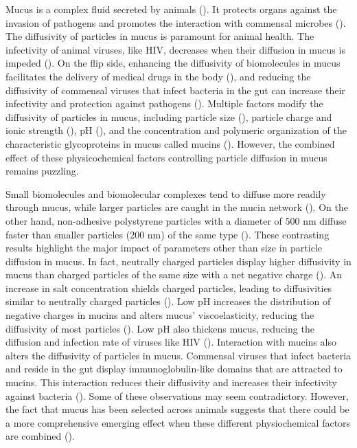 \documentclass[aps,prl,preprint,superscriptaddress,showkeys,linenumbers]{revtex4-1}
\begin{document}
Mucus is a complex fluid secreted by animals (\cite{SpagnSPRINGER2015,Krajina2017ACS}). It protects organs against the invasion of pathogens and promotes the interaction with commensal microbes (\cite{Backhed2005,Bakshani2018,Silveira2016}). 
\textcolor{Antonio}{The diffusivity of particles in mucus is paramount for animal health. The infectivity of animal viruses, like HIV, decreases when their diffusion in mucus is impeded (\cite{LaiJVirol2009}). On the flip side, enhancing the diffusivity of biomolecules in mucus facilitates the delivery of medical drugs in the body (\cite{ConeAdvDDM2009}), and reducing the diffusivity of commensal viruses that infect bacteria in the gut can increase their infectivity and protection against pathogens (\cite{BarrPNAS2013, BarrPNAS2015}). Multiple factors modify the diffusivity of particles in mucus, including particle size (\cite{Amsden1999, ConeAdvDDM2009}), particle charge and ionic strength (\cite{AbdulEurPharBioJ2015, ArendsLangmuir2013, HansingEurPHYSJ2016, LeilegBiophyscial2010, LIBiophysical2013}), pH (\cite{CelliPNAS2009, LaiJVirol2009, LeilegBiophyscial2010, SpagnSPRINGER2015, SukNanomedicine2011}), and the concentration and polymeric organization of the characteristic glycoproteins in mucus called mucins (\cite{BarrPNAS2015}). However, the combined effect of these physicochemical factors controlling particle diffusion in mucus remains puzzling.}

\textcolor{Antonio}{Small biomolecules and biomolecular complexes tend to diffuse more readily through mucus, while larger particles are caught in the mucin network (\cite{Amsden1999, ConeAdvDDM2009}). On the other hand, non-adhesive polystyrene particles with a diameter of 500 nm diffuse faster than smaller particles (200 nm) of the same type (\cite{LaiPNAS2007}). These contrasting results highlight the major impact of parameters other than size in particle diffusion in mucus. In fact, neutrally charged particles display higher diffusivity in mucus than charged particles of the same size with a net negative charge (\cite{AbdulEurPharBioJ2015, ArendsLangmuir2013, HansingEurPHYSJ2016, LeilegBiophyscial2010, LIBiophysical2013}). An increase in salt concentration shields charged particles, leading to diffusivities similar to neutrally charged particles (\cite{ArendsLangmuir2013, LeilegBiophyscial2010, HansingEurPHYSJ2016}). Low pH increases the distribution of negative charges in mucins and alters mucus' viscoelasticity, reducing the diffusivity of most particles (\cite{CelliPNAS2009, LaiJVirol2009, LeilegBiophyscial2010, SpagnSPRINGER2015, SukNanomedicine2011}). Low pH also thickens mucus, reducing the diffusion and infection rate of viruses like HIV (\cite{LaiJVirol2009}). 
Interaction with mucins also alters the diffusivity of particles in mucus. Commensal viruses that infect bacteria and reside in the gut display immunoglobulin-like domains that are attracted to mucins. This interaction reduces their diffusivity and increases their infectivity against bacteria (\cite{BarrPNAS2013, BarrPNAS2015}). Some of these observations may seem contradictory. However, the fact that mucus has been selected across animals suggests that there could be a more comprehensive emerging effect when these different physiochemical factors are combined (\cite{LangMBE2016}).}
\end{document}
